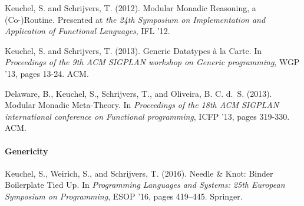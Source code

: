 {%

\begin{center}
  \begin{minipage}{0.85\columnwidth}
    Keuchel, S. and Schrijvers, T. (2012).
    \newblock Modular Monadic Reasoning, a (Co-)Routine.
    \newblock Presented at \emph{the 24th Symposium on Implementation and
      Application of Functional Languages}, IFL '12.
  \end{minipage}
\end{center}

\begin{center}
  \begin{minipage}{0.85\columnwidth}
    Keuchel, S. and Schrijvers, T. (2013).
    \newblock Generic Datatypes à la Carte.
    \newblock In {\em Proceedings of the 9th ACM SIGPLAN workshop on Generic
      programming}, WGP ’13, pages 13-24. ACM.
  \end{minipage}
\end{center}

\begin{center}
  \begin{minipage}{0.85\columnwidth}
    Delaware, B., Keuchel, S., Schrijvers, T., and Oliveira,
    B. C. d.~S. (2013).
    \newblock Modular Monadic Meta-Theory.
    \newblock In {\em Proceedings of the 18th ACM SIGPLAN international
      conference on Functional programming}, ICFP '13, pages 319-330. ACM.
  \end{minipage}
\end{center}



\paragraph{Genericity}

\begin{center}
  \begin{minipage}{0.85\columnwidth}
    Keuchel, S., Weirich, S., and Schrijvers, T. (2016).
    \newblock Needle {\&} {K}not: {B}inder {B}oilerplate {T}ied {U}p.
    \newblock In {\em Programming Languages and Systems: 25th European Symposium
      on Programming}, ESOP '16, pages 419--445. Springer.
  \end{minipage}
\end{center}

}
